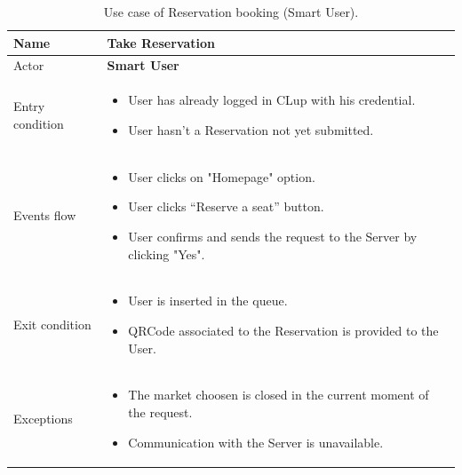 \begin{table}[H]\begin{tabular}{|p{5cm} | p{7cm} | }
	\hline
	Name & \textbf{Take Reservation} \\
	\hline
	Actor & \textbf{Smart User} \\
	\hline
	Entry condition &
	\begin{itemize}
		\item User has already logged in CLup with his credential. 
		\item User hasn't a Reservation not yet submitted. 
	\end{itemize} \\
	\hline
	Events flow & 
	\begin{itemize}
		\item User clicks on "Homepage" option.
		\item User clicks “Reserve a seat” button.
		\item User confirms and sends the request to the Server by clicking "Yes".
	\end{itemize} \\
	\hline
	Exit condition &
	\begin{itemize}	
		\item User is inserted in the queue.
		\item QRCode associated to the Reservation is provided to the User. 
	\end{itemize} \\
	\hline 
	Exceptions & \begin{itemize}
    \item The market choosen is closed in the current moment of the request.
    \item Communication with the Server is unavailable.
    \end{itemize}
 \\
	\hline
\end{tabular}
\caption{Use case of Reservation booking (Smart User).}
\end{table}

\pagebreak

